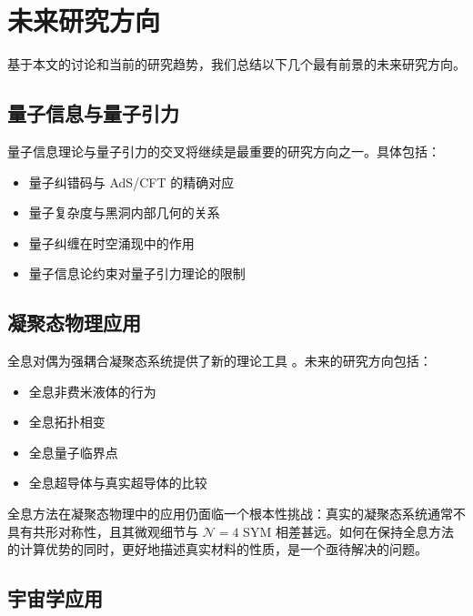 
\section{未来研究方向}

基于本文的讨论和当前的研究趋势，我们总结以下几个最有前景的未来研究方向。

\subsection{量子信息与量子引力}

量子信息理论与量子引力的交叉将继续是最重要的研究方向之一。具体包括：
\begin{itemize}
    \item 量子纠错码与 AdS/CFT 的精确对应
    \item 量子复杂度与黑洞内部几何的关系
    \item 量子纠缠在时空涌现中的作用
    \item 量子信息论约束对量子引力理论的限制
\end{itemize}

\subsection{凝聚态物理应用}

全息对偶为强耦合凝聚态系统提供了新的理论工具 \cite{Hartnoll2008}。未来的研究方向包括：
\begin{itemize}
    \item 全息非费米液体的行为
    \item 全息拓扑相变
    \item 全息量子临界点
    \item 全息超导体与真实超导体的比较
\end{itemize}

\begin{remark}
全息方法在凝聚态物理中的应用仍面临一个根本性挑战：真实的凝聚态系统通常不具有共形对称性，且其微观细节与 $\mathcal{N}=4$ SYM 相差甚远。如何在保持全息方法的计算优势的同时，更好地描述真实材料的性质，是一个亟待解决的问题。
\end{remark}

\subsection{宇宙学应用}

